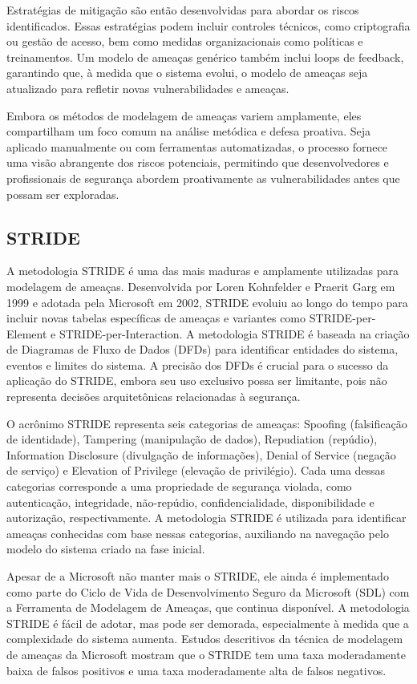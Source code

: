Estratégias de mitigação são então desenvolvidas para abordar os riscos
identificados. Essas estratégias podem incluir controles técnicos, como criptografia ou
gestão de acesso, bem como medidas organizacionais como políticas e treinamentos.
Um modelo de ameaças genérico também inclui loops de feedback, garantindo
que, à medida que o sistema evolui, o modelo de ameaças seja atualizado para
refletir novas vulnerabilidades e ameaças. 

Embora os métodos de modelagem de ameaças variem amplamente, eles
compartilham um foco comum na análise metódica e defesa proativa. Seja aplicado
manualmente ou com ferramentas automatizadas, o processo fornece uma visão abrangente
dos riscos potenciais, permitindo que desenvolvedores e profissionais de
segurança abordem proativamente as vulnerabilidades antes que possam ser exploradas.

\subsection{STRIDE}
\label{sec:STRIDE}

A metodologia STRIDE é uma das mais maduras e amplamente utilizadas para
modelagem de ameaças. Desenvolvida por Loren Kohnfelder e Praerit Garg em 1999 e adotada
pela Microsoft em 2002, STRIDE evoluiu ao longo do tempo para incluir novas tabelas
específicas de ameaças e variantes como STRIDE-per-Element e STRIDE-per-Interaction.
A metodologia STRIDE é baseada na criação de Diagramas de Fluxo de Dados
(DFDs) para identificar entidades do sistema, eventos e limites do sistema. A
precisão dos DFDs é crucial para o sucesso da aplicação do STRIDE, embora seu uso
exclusivo possa ser limitante, pois não representa decisões arquitetônicas relacionadas
à segurança. 

O acrônimo STRIDE representa seis categorias de ameaças: Spoofing
(falsificação de identidade), Tampering (manipulação de dados), Repudiation (repúdio),
Information Disclosure (divulgação de informações), Denial of Service (negação de serviço)
e Elevation of Privilege (elevação de privilégio). Cada uma dessas categorias
corresponde a uma propriedade de segurança violada, como autenticação, integridade,
não-repúdio, confidencialidade, disponibilidade e autorização, respectivamente.
A metodologia STRIDE é utilizada para identificar ameaças conhecidas com base
nessas categorias, auxiliando na navegação pelo modelo do sistema criado na fase
inicial. 

Apesar de a Microsoft não manter mais o STRIDE, ele ainda é implementado como
parte do Ciclo de Vida de Desenvolvimento Seguro da Microsoft (SDL) com a Ferramenta
de Modelagem de Ameaças, que continua disponível. A metodologia
STRIDE é fácil de adotar, mas pode ser demorada, especialmente à medida que a
complexidade do sistema aumenta. Estudos descritivos da técnica de modelagem de ameaças da
Microsoft mostram que o STRIDE tem uma taxa moderadamente baixa de falsos positivos e
uma taxa moderadamente alta de falsos negativos. 

